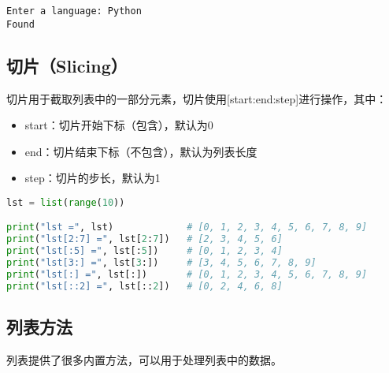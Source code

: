 \begin{tcolorbox}
	\begin{verbatim}
Enter a language: Python
Found
\end{verbatim}
\end{tcolorbox}

\vspace{0.5cm}

\subsection{切片（Slicing）}

切片用于截取列表中的一部分元素，切片使用[start:end:step]进行操作，其中：

\begin{itemize}
	\item start：切片开始下标（包含），默认为0
	\item end：切片结束下标（不包含），默认为列表长度
	\item step：切片的步长，默认为1
\end{itemize}

\vspace{-0.5cm}

\begin{lstlisting}[language=Python]
lst = list(range(10))

print("lst =", lst)             # [0, 1, 2, 3, 4, 5, 6, 7, 8, 9]
print("lst[2:7] =", lst[2:7])   # [2, 3, 4, 5, 6]
print("lst[:5] =", lst[:5])     # [0, 1, 2, 3, 4]
print("lst[3:] =", lst[3:])     # [3, 4, 5, 6, 7, 8, 9]
print("lst[:] =", lst[:])       # [0, 1, 2, 3, 4, 5, 6, 7, 8, 9]
print("lst[::2] =", lst[::2])   # [0, 2, 4, 6, 8]
\end{lstlisting}

\vspace{0.5cm}

\subsection{列表方法}

列表提供了很多内置方法，可以用于处理列表中的数据。\\

